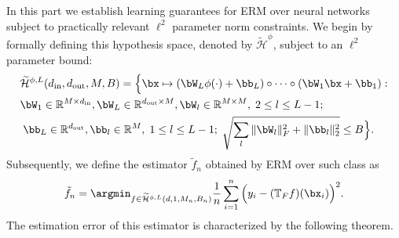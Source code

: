 \documentclass[11pt]{article}
\begin{document}
In this part we establish learning guarantees for ERM over neural networks subject to practically relevant $\ell^2$ parameter norm constraints. We begin by formally defining this hypothesis space, denoted by $\widetilde{\mathcal{H}}^{\phi}$, subject to an $\ell^2$ parameter bound:
\begin{equation}
    \begin{aligned}        &\widetilde{\mathcal{H}}^{\phi,L}(d_{\text{in}}, d_{\text{out}},M,B) = \Big\{  \bx \mapsto ( \bW_{L} \phi(\cdot) + \bb_{L}) \circ \cdots \circ (\bW_1 \bx + \bb_{1}): \\
        & \bW_1 \in\mathbb{R}^{M \times d_{\text{in}}} , \bW_L \in \mathbb{R}^{d_{\text{out}} \times M}, \bW_l \in \mathbb{R}^{M \times M}, \;  2 \leq l \leq L-1; \\
        & \; \bb_L \in \mathbb{R}^{d_{\text{out}}}, \bb_l \in \mathbb{R}^{M}, \;  1 \leq l \leq L-1; \; \sqrt{\sum_{l} \|\bW_l\|_F^2 + \|\bb_l\|_2^2} \leq B  \Big\}.
    \end{aligned}
    \label{eq:model-class-l2}
\end{equation}
Subsequently, we define the estimator $\widetilde{f}_n$ obtained by ERM over such class as
\begin{equation} 
    \tilde{f}_n = \argmin_{f \in \widetilde{\mathcal{H}}^{\phi,L}(d, 1,M_n,B_n)} \frac{1}{n} \sum_{i=1}^n \Big( y_i -(\mathbb{T}_F f)(\bx_i)\Big)^2.
    \label{eq:ERM-l2}
\end{equation}
The estimation error of this estimator is characterized by the following theorem.
\end{document}
